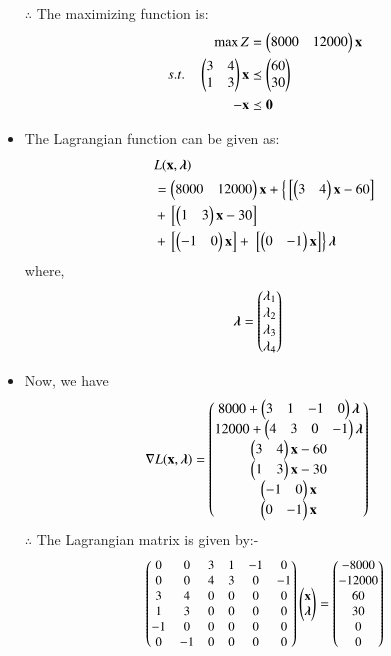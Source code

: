 \documentclass[journal,12pt,twocolumn]{IEEEtran}
\begin{document}
\begin{itemize}
$\therefore$ The maximizing function is:
\begin{align}
        \max Z &= \begin{pmatrix}8000& 12000\end{pmatrix}\mathbf{x}\\
        s.t. \quad 
        \begin{pmatrix}3 & 4\\ 1 & 3 \end{pmatrix}\mathbf{x} &\preceq \begin{pmatrix}60\\30\end{pmatrix} \\
        \mathbf{-x} &\preceq \mathbf{0}
\end{align}
\item The Lagrangian function can be given as:
\begin{equation}
\begin{aligned}
    &L(\mathbf{x},\boldsymbol{\lambda}) \\ &= \begin{pmatrix}8000 & 12000\end{pmatrix}\mathbf{x}+\left\{{}\left[\begin{pmatrix}3 & 4\end{pmatrix}\mathbf{x}-60\right]\right. \\ &+ {}\left[\begin{pmatrix}1 & 3\end{pmatrix}\mathbf{x}-30\right] \\ &+ {}\left[\begin{pmatrix}-1 & 0\end{pmatrix}\mathbf{x}\right] +\left.{}\left[\begin{pmatrix}0 & -1\end{pmatrix}\mathbf{x}\right]\right\}\boldsymbol{\lambda}
\end{aligned}
\end{equation}
where,
\begin{align}
    \boldsymbol{\lambda} &= \begin{pmatrix}\lambda_1 \\ \lambda_2 \\ \lambda_3 \\ \lambda_4\end{pmatrix}
\end{align}
\item Now, we have
\begin{align}
    \nabla L(\mathbf{x},\boldsymbol{\lambda}) &= \begin{pmatrix}8000+ \begin{pmatrix}3 & 1 & -1 & 0 \end{pmatrix}\boldsymbol{\lambda}\\ 12000+\begin{pmatrix}4 & 3 &0 & -1\end{pmatrix}\boldsymbol{\lambda} \\ \begin{pmatrix}3 & 4\end{pmatrix}\mathbf{x}-60 \\ \begin{pmatrix}1 & 3\end{pmatrix}\mathbf{x}-30 \\ \begin{pmatrix}-1 & 0\end{pmatrix}\mathbf{x} \\ \begin{pmatrix}0 & -1\end{pmatrix}\mathbf{x}\end{pmatrix}
\end{align}
$\therefore$ The Lagrangian matrix is given by:-
\begin{align}
  \small{\myvec{0 & 0 & 3 & 1 & -1 & 0 \\ 0 & 0 & 4 & 3 &0 & -1 \\ 3 & 4 & 0 & 0 & 0 & 0 \\ 1 & 3 & 0 & 0 & 0 & 0 \\ -1 & 0 & 0 & 0 & 0 & 0 \\ 0 & -1 & 0 & 0 & 0 & 0 }\myvec{\vec{x} \\ \boldsymbol{\lambda} }}= \small{\myvec{-8000 \\ -12000 \\ 60 \\ 30 \\ 0 \\0 }}

\end{align}
\end{itemize}
\end{document}
